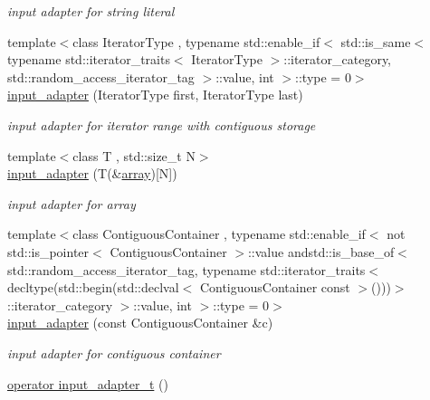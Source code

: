 \begin{DoxyCompactItemize}
\begin{DoxyCompactList}\small\item\em input adapter for string literal \end{DoxyCompactList}\item 
{\footnotesize template$<$class Iterator\+Type , typename std\+::enable\+\_\+if$<$ std\+::is\+\_\+same$<$ typename std\+::iterator\+\_\+traits$<$ Iterator\+Type $>$\+::iterator\+\_\+category, std\+::random\+\_\+access\+\_\+iterator\+\_\+tag $>$\+::value, int $>$\+::type  = 0$>$ }\\\hyperlink{classnlohmann_1_1detail_1_1input__adapter_ad6824b0f792691f75186c527fa31a6b4}{input\+\_\+adapter} (Iterator\+Type first, Iterator\+Type last)
\begin{DoxyCompactList}\small\item\em input adapter for iterator range with contiguous storage \end{DoxyCompactList}\item 
{\footnotesize template$<$class T , std\+::size\+\_\+t N$>$ }\\\hyperlink{classnlohmann_1_1detail_1_1input__adapter_aa2392138bf8307df1994dc7eb22d51ce}{input\+\_\+adapter} (T(\&\hyperlink{namespacenlohmann_1_1detail_a1ed8fc6239da25abcaf681d30ace4985af1f713c9e000f5d3f280adbd124df4f5}{array})\mbox{[}N\mbox{]})
\begin{DoxyCompactList}\small\item\em input adapter for array \end{DoxyCompactList}\item 
{\footnotesize template$<$class Contiguous\+Container , typename std\+::enable\+\_\+if$<$ not std\+::is\+\_\+pointer$<$ Contiguous\+Container $>$\+::value andstd\+::is\+\_\+base\+\_\+of$<$ std\+::random\+\_\+access\+\_\+iterator\+\_\+tag, typename std\+::iterator\+\_\+traits$<$ decltype(std\+::begin(std\+::declval$<$ Contiguous\+Container const  $>$()))$>$\+::iterator\+\_\+category $>$\+::value, int $>$\+::type  = 0$>$ }\\\hyperlink{classnlohmann_1_1detail_1_1input__adapter_a6f92fe82cb49a508dbfb297c5630cc7f}{input\+\_\+adapter} (const Contiguous\+Container \&c)
\begin{DoxyCompactList}\small\item\em input adapter for contiguous container \end{DoxyCompactList}\item 
\hyperlink{classnlohmann_1_1detail_1_1input__adapter_a4ef04b9490247fc38f3d1c2a9e18789b}{operator input\+\_\+adapter\+\_\+t} ()
\end{DoxyCompactItemize}


